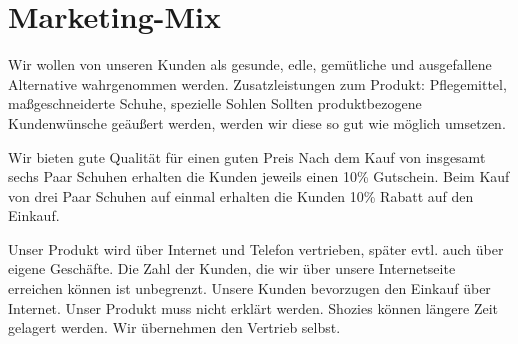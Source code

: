 \chapter{Marketing-Mix}
\label{cha:6}
Wir wollen von unseren Kunden als gesunde, edle, gemütliche und ausgefallene Alternative wahrgenommen werden.
Zusatzleistungen zum Produkt: Pflegemittel, maßgeschneiderte Schuhe, spezielle Sohlen
Sollten produktbezogene Kundenwünsche geäußert werden, werden wir diese so gut wie möglich umsetzen.

Wir bieten gute Qualität für einen guten Preis
Nach dem Kauf von insgesamt sechs Paar Schuhen erhalten die Kunden jeweils einen 10\% Gutschein. Beim Kauf von drei Paar Schuhen auf einmal erhalten die Kunden 10\% Rabatt auf den Einkauf.

Unser Produkt wird über Internet und Telefon vertrieben, später evtl. auch über eigene Geschäfte.
Die Zahl der Kunden, die wir über unsere Internetseite erreichen können ist unbegrenzt.
Unsere Kunden bevorzugen den Einkauf über Internet.
Unser Produkt muss nicht erklärt werden.
Shozies können längere Zeit gelagert werden.
Wir übernehmen den Vertrieb selbst. 